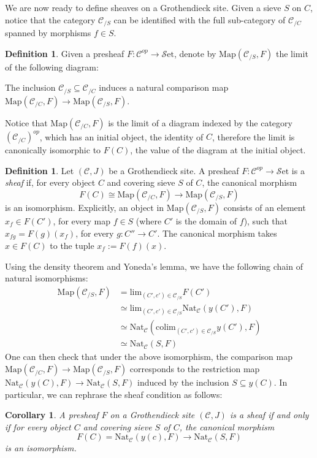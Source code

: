 \documentclass[10pt]{amsart}
\newcommand{\C}{\mathscr{C}}
\newcommand{\Map}{\mathrm{Map}}
\newcommand{\set}{\mathscr{S}\mathrm{et}}
\newcommand{\Nat}{\mathrm{Nat}}
\newcommand{\colim}{\mathrm{colim}}
\newtheorem{corollary}[equation]{Corollary}
\theoremstyle{definition}
\newtheorem{definition}[equation]{Definition}
\theoremstyle{remark}
\numberwithin{equation}{section}
\begin{document}
	We are now ready to define sheaves on a Grothendieck site. Given a sieve $S$ on $C$, notice that the category $\C_{/S}$ can be identified with the full sub-category of $\C_{/C}$ spanned by morphisms $f\in S$. 
	\begin{definition}\label{map}
		Given a presheaf $F\colon \C^{op}\to\set$, denote by $\Map(\C_{/S},F)$ the limit of the following diagram:
	\begin{center}
	\end{center}The inclusion $\C_{/S}\subseteq\C_{/C}$ induces a natural \textnormal{comparison map} $\Map(\C_{/C},F)\to\Map(\C_{/S},F)$.
	\end{definition}
	 Notice that $\Map(\C_{/C},F)$ is the limit of a diagram indexed by the category $(\C_{/C})^{op}$, which has an initial object, the identity of $C$, therefore the limit is canonically isomorphic to $F(C)$, the value of the diagram at the initial object.
	\begin{definition}
		Let $(\C, J)$ be a Grothendieck site. A {presheaf} $F : \C^{op} \to \set$ is a \emph{sheaf} if, for every object $C$ and covering sieve $S$ of $C$, the canonical morphism
		\[ F(C)\cong\Map(\C_{/C},F) \to \Map(\C_{/S},F)\]
		is an isomorphism. Explicitly, an object in $\Map(\C_{/S},F)$ consists of an element $x_f\in F(C')$, for every map $f\in S$ (where $C'$ is the domain of $f$), such that $x_{fg}=F(g)(x_f)$, for every $g\colon C''\to C'$. The canonical morphism takes $x\in F(C)$ to the tuple $x_f:=F(f)(x)$. 
	\end{definition}Using the density theorem and Yoneda's lemma, we have the following chain of natural isomorphisms:
	\begin{align*}
		\Map(\C_{/S},F) &= \textrm{lim}_{(C',c')\in\C_{/S}}F(C') \\
		&\simeq \textrm{lim}_{(C',c')\in\C_{/S}}\Nat_\C(y(C'),F) \\
		&\simeq \Nat_\C(\colim_{(C',c')\in\C_{/S}}y(C'),F)\\
		&\simeq \Nat_\C(S,F)
	\end{align*}One can then check that under the above isomorphism, the comparison map $\Map(\C_{/C},F)\to\Map(\C_{/S},F)$ corresponds to the restriction map $\Nat_\C(y(C),F)\to\Nat_\C(S,F)$ induced by the inclusion $S\subseteq y(C)$. In particular, we can rephrase the sheaf condition as follows:
	\begin{corollary}
		A presheaf $F$ on a Grothendieck site $(\C, J)$ is a sheaf if and only if for every object $C$ and covering sieve $S$ of $C$, the canonical morphism
		\[ F(C)  = \Nat_\C(y(c),F)\to \Nat_\C(S,F) \]
		is an isomorphism. 
	\end{corollary}
	
\end{document}

